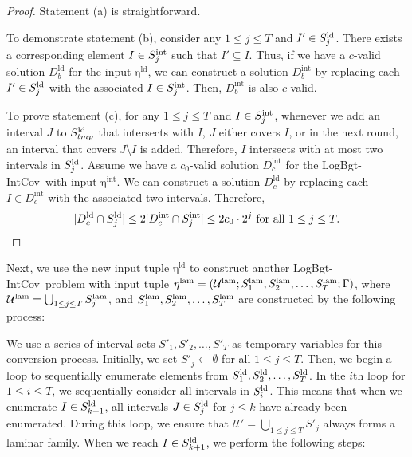 \documentclass[11pt,a4paper]{article} \usepackage{enumitem}
\newcommand{\calU}{\mathcal{U}}
\newcommand{\LBOintcov}{\textsf{LogBgt-IntCov}}
\newcommand{\intS}[1]{\ifx\relax#1\relax
    S^{\operatorname{int}} \else
    S^{\operatorname{int}}_{#1} \fi
}
\newcommand{\intD}{D^{\operatorname{int}}}
\newcommand{\inteta}{\operatorname{\eta^{int}}}
\newcommand{\ldS}[1]{\ifx\relax#1\relax
    S^{\operatorname{ld}} \else
    S^{\operatorname{ld}}_{#1} \fi
}
\newcommand{\ldD}{D^{\operatorname{ld}}}
\newcommand{\ldeta}{\operatorname{\eta^{ld}}}
\newcommand{\lamU}{\operatorname{\calU^{lam}}}
\newcommand{\lamS}[1]{\ifx\relax#1\relax
    S^{\operatorname{lam}}
  \else
    S^{\operatorname{lam}}_{#1} 
  \fi
}
\newcommand{\lameta}{\operatorname{\eta^{lam}}}
\theoremstyle{definition}
\begin{document}
\begin{proof}

Statement (a) is straightforward. 

To demonstrate statement (b), consider any $1 \leq j \leq T$ and $I' \in \ldS{j}$. There exists a corresponding element $I \in \intS{j}$ such that $I' \subseteq I$. Thus, if we have a $c$-valid solution $\ldD_b$ for the input $\ldeta$, we can construct a solution $\intD_b$ by replacing each $I' \in \ldS{j}$ with the associated $I \in \intS{j}$. Then, $\intD_b$ is also $c$-valid.

To prove statement (c), for any $1 \leq j \leq T$ and $I \in \intS{j}$, whenever we add an interval $J$ to $\ldS{tmp}$ that intersects with $I$, $J$ either covers $I$, or in the next round, an interval that covers $J \setminus I$ is added. Therefore, $I$ intersects with at most two intervals in $\ldS{j}$. Assume we have a $c_0$-valid solution $\intD_c$ for the \LBOintcov\ with input $\inteta$. We can construct a solution $\ldD_c$ by replacing each $I \in \intD_c$ with the associated two intervals. Therefore, 
$$
|\ldD_c \cap \ldS{j}| \leq 2 |\intD_c \cap \intS{j}| \leq 2c_0 \cdot 2^j \text{ for all } 1 \leq j \leq T.
$$
\end{proof}

Next, we use the new input tuple $\ldeta$ to construct another \LBOintcov\ problem with input tuple $\lameta = (\lamU; \lamS{1}, \lamS{2}, \ldots, \lamS{T}; \Gamma)$, where $\lamU = \bigcup_{1 \leq j \leq T} \lamS{j}$, and $\lamS{1}, \lamS{2}, \ldots, \lamS{T}$ are constructed by the following process:

We use a series of interval sets $S'_1, S'_2, \dots, S'_T$ as temporary variables for this conversion process. Initially, we set $S'_j \gets \emptyset$ for all $1 \leq j \leq T$. 
Then, we begin a loop to sequentially enumerate elements from $\ldS{1}, \ldS{2}, \dots, \ldS{T}$. In the $i$th loop
for $1\leq i\leq T$, we sequentially consider all intervals in $\ldS{i}$. This means that when we enumerate $I \in \ldS{k+1}$, all intervals $J \in \ldS{j}$ for $j \leq k$ have already been enumerated. 
During this loop, we ensure that $\calU' = \bigcup_{1 \leq j \leq T} S'_j$ always forms a laminar family. When we reach $I \in \ldS{k+1}$, we perform the following steps:
\end{document}
